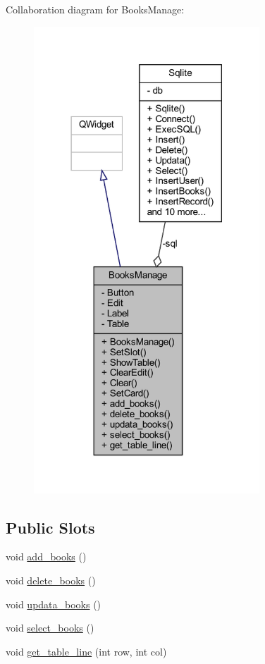 Collaboration diagram for Books\+Manage\+:
\nopagebreak
\begin{figure}[H]
\begin{center}
\leavevmode
\includegraphics[width=240pt]{class_books_manage__coll__graph}
\end{center}
\end{figure}
\subsection*{Public Slots}
\begin{DoxyCompactItemize}
\item 
void \mbox{\hyperlink{class_books_manage_a39c7bdd07e0af93379e1270becd8525c}{add\+\_\+books}} ()
\item 
void \mbox{\hyperlink{class_books_manage_ae8adc7f70a2e95f5a5991137e11a18ae}{delete\+\_\+books}} ()
\item 
void \mbox{\hyperlink{class_books_manage_aba42cfe2129f1b92dab5a08e1f73ee07}{updata\+\_\+books}} ()
\item 
void \mbox{\hyperlink{class_books_manage_ab2a76473efc3b68a9e1589cca6ab615d}{select\+\_\+books}} ()
\item 
void \mbox{\hyperlink{class_books_manage_a0269967278f32edfd3f14ccff0a41715}{get\+\_\+table\+\_\+line}} (int row, int col)
\end{DoxyCompactItemize}
